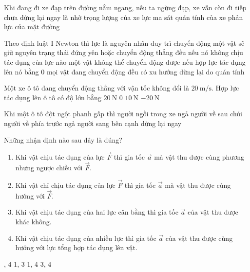 \begin{ex}
	Khi đang đi xe đạp trên đường nằm ngang, nếu ta ngừng đạp, xe vẫn còn đi tiếp chưa dừng lại ngay là nhờ
	\choice
	{trọng lượng của xe}
	{lực ma sát}
	{\True quán tính của xe}
	{phản lực của mặt đường}
	\loigiai{}
\end{ex}
\begin{ex}
	Theo định luật I Newton thì 	
	\choice
	{lực là nguyên nhân duy trì chuyển động}
	{\True một vật sẽ giữ nguyên trạng thái đứng yên hoặc chuyển động thẳng đều nếu nó không chịu tác dụng của lực nào}
	{một vật không thể chuyển động được nếu hợp lực tác dụng lên nó bằng 0}
	{mọi vật đang chuyển động đều có xu hướng dừng lại do quán tính}
	\loigiai{}
\end{ex}
\begin{ex}
	Một xe ô tô đang chuyển động thẳng với vận tốc không đổi là $\SI{20}{\meter/\second}$. Hợp lực tác dụng lên ô tô có độ lớn bằng
	\choice
	{$\SI{20}{\newton}$}
	{\True $0$}
	{$\SI{10}{\newton}$}
	{$\SI{-20}{\newton}$}
	\loigiai{}
\end{ex}
\begin{ex}
	Khi một ô tô đột ngột phanh gấp thì người ngồi trong xe	
	\choice
	{ngả người về sau}
	{\True chúi người về phía trước}
	{ngả người sang bên cạnh}
	{dừng lại ngay}
	\loigiai{}
\end{ex}
\begin{ex}
	Những nhận định nào sau đây là đúng?
	\begin{enumerate}[label=\arabic*.]
		\item Khi vật chịu tác dụng của lực $\vec{F}$ thì gia tốc $\vec{a}$ mà vật thu được cùng phương nhưng ngược chiều với $\vec{F}$.
		\item Khi vật chỉ chịu tác dụng của lực $\vec{F}$ thì gia tốc $\vec{a}$ mà vật thu được cùng hướng với $\vec{F}$.
		\item Khi vật chịu tác dụng của hai lực cân bằng thì gia tốc $\vec{a}$ của vật thu được khác không.
		\item Khi vật chịu tác dụng của nhiều lực thì gia tốc $\vec{a}$ của vật thu được cùng hướng với lực tổng hợp tác dụng lên vật.
	\end{enumerate}
	\choice
	{, 4}
	{1, 3}
	{1, 4}
	{3, 4}
	\loigiai{}
\end{ex}
